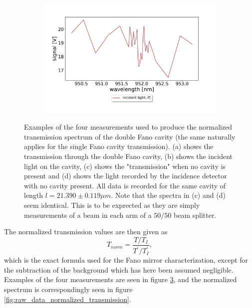 \begin{figure}[h!]
\begin{subfigure}[b]{0.49\textwidth}
        \caption{}
        \label{fig:raw_data_trans_no_cavity}
    \end{subfigure}
    \begin{subfigure}[b]{0.49\textwidth}
        \includegraphics[width=\textwidth]{figures/raw_data_incident_light_no_cavity.pdf}
        \caption{}
        \label{fig:raw_data_incident_no_cavity}
    \end{subfigure}
    \caption{Examples of the four measurements used to produce the normalized transmission spectrum of the double Fano cavity (the same naturally applies for the single Fano cavity transmission). (a) shows the transmission through the double Fano cavity, (b) shows the incident light on the cavity, (c) shows the "transmission" when no cavity is present and (d) shows the light recorded by the incidence detector with no cavity present. All data is recorded for the same cavity of length $l=21.390 \pm 0.119 \mu m$. Note that the spectra in (c) and (d) seem identical. This is to be exprected as they are simply measurements of a beam in each arm of a $50/50$ beam splitter.}
    \label{fig:raw_data}
\end{figure}

The normalized transmission values are then given as
\begin{equation}
    T_{norm} = \frac{T/T_I}{T^{\prime}/T_I^{\prime}},
    \label{eq:normalized_cavity_spectrum}
\end{equation}
which is the exact formula used for the Fano mirror characterization, except for the subtraction of the background which has here been assumed negligible. Examples of the four measurements are seen in figure \ref{fig:raw_data}, and the normalized spectrum is correspondingly seen in figure \ref{fig:raw_data_normalized_transmission}.

